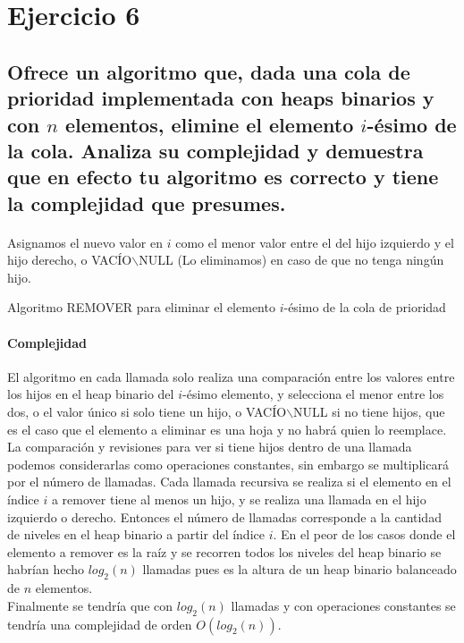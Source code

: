 \documentclass[12pt]{article}
\begin{document}
 \section{Ejercicio 6}
 \subsection{Ofrece un algoritmo que, dada una cola de prioridad implementada con heaps binarios y con $n$ elementos, elimine el elemento $i$-ésimo de la cola. Analiza su complejidad y demuestra que en efecto tu algoritmo es correcto y tiene la complejidad que presumes.}
 \paragraph{} 
 \begin{algorithm}[H]
 	\SetAlgoLined
		Asignamos el nuevo valor en $i$ como el menor valor entre el del hijo izquierdo y el hijo derecho, o VACÍO$\backslash$NULL (Lo eliminamos) en caso de que no tenga ningún hijo.\;
 	\caption{Algoritmo REMOVER para eliminar el elemento $i$-ésimo de la cola de prioridad}
 \end{algorithm}
\paragraph{Complejidad} El algoritmo en cada llamada solo realiza una comparación entre los valores entre los hijos en el heap binario del $i$-ésimo elemento, y selecciona el menor entre los dos, o el valor único si solo tiene un hijo, o VACÍO$\backslash$NULL si no tiene hijos, que es el caso que el elemento a eliminar es una hoja y no habrá quien lo reemplace. La comparación y revisiones para ver si tiene hijos dentro de una llamada podemos considerarlas como operaciones constantes, sin embargo se multiplicará por el número de llamadas. Cada llamada recursiva se realiza si el elemento en el índice $i$ a remover tiene al menos un hijo, y se realiza una llamada en el hijo izquierdo o derecho. Entonces el número de llamadas corresponde a la cantidad de niveles en el heap binario a partir del índice $i$. En el peor de los casos donde el elemento a remover es la raíz y se recorren todos los niveles del heap binario se habrían hecho $log_2(n)$ llamadas pues es la altura de un heap binario balanceado de $n$ elementos.\\ Finalmente se tendría que con $log_2(n)$ llamadas y con operaciones constantes se tendría una complejidad de orden $O(log_2(n))$.
\end{document}
